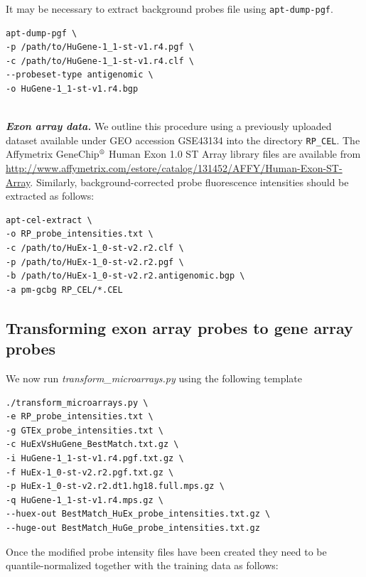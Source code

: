 \documentclass[a4paper,12pt]{article}
\begin{document}
It may be necessary to extract background probes file using \texttt{apt-dump-pgf}.

\begin{verbatim}
apt-dump-pgf \
-p /path/to/HuGene-1_1-st-v1.r4.pgf \
-c /path/to/HuGene-1_1-st-v1.r4.clf \
--probeset-type antigenomic \
-o HuGene-1_1-st-v1.r4.bgp
\end{verbatim}

\noindent\\
\textbf{\textit{Exon array data.}} We outline this procedure using a previously uploaded dataset available under GEO accession GSE43134 into the directory \texttt{RP\_CEL}. The Affymetrix GeneChip$^{\text{\textregistered}}$ Human Exon 1.0 ST Array library files are available from \url{http://www.affymetrix.com/estore/catalog/131452/AFFY/Human-Exon-ST-Array}. Similarly, background-corrected probe fluorescence intensities should be extracted as follows:

\begin{verbatim}
apt-cel-extract \
-o RP_probe_intensities.txt \
-c /path/to/HuEx-1_0-st-v2.r2.clf \
-p /path/to/HuEx-1_0-st-v2.r2.pgf \
-b /path/to/HuEx-1_0-st-v2.r2.antigenomic.bgp \
-a pm-gcbg RP_CEL/*.CEL
\end{verbatim}

\subsection{Transforming exon array probes to gene array probes}
\label{usecase:transforming}

We now run \textit{transform\_microarrays.py} using the following template

\begin{verbatim}
./transform_microarrays.py \
-e RP_probe_intensities.txt \
-g GTEx_probe_intensities.txt \
-c HuExVsHuGene_BestMatch.txt.gz \
-i HuGene-1_1-st-v1.r4.pgf.txt.gz \
-f HuEx-1_0-st-v2.r2.pgf.txt.gz \
-p HuEx-1_0-st-v2.r2.dt1.hg18.full.mps.gz \
-q HuGene-1_1-st-v1.r4.mps.gz \
--huex-out BestMatch_HuEx_probe_intensities.txt.gz \
--huge-out BestMatch_HuGe_probe_intensities.txt.gz
\end{verbatim}

Once the modified probe intensity files have been created they need to be quantile-normalized together with the training data as follows:
\end{document}
